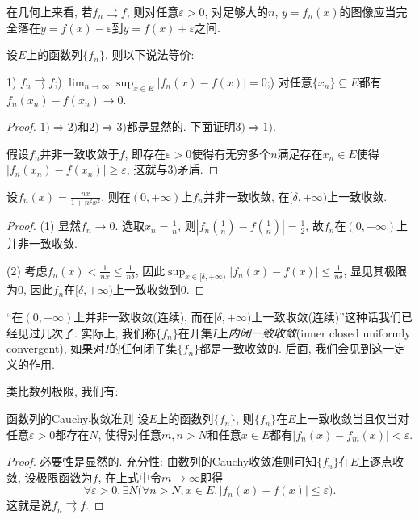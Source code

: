 在几何上来看, 若$f_n \rightrightarrows f$, 则对任意$\varepsilon >0$, 对足够大的$n$, $y=f_n(x)$的图像应当完全落在$y=f(x)-\varepsilon$到$y=f(x)+\varepsilon$之间. 

\begin{proposition}{}
	设$E$上的函数列$\{ f_n \}$, 则以下说法等价: 
	
	1) $f_n \rightrightarrows f$;) $\displaystyle \lim_{n\to \infty} \sup_{x \in E}|f_n(x) - f(x)|=0$;) 对任意$\{ x_n \}\subseteq E$都有$f_n(x_n)-f(x_n) \to 0$. 
\end{proposition}
\begin{proof}
	$1) \Rightarrow 2)$和$2) \Rightarrow 3)$都是显然的. 下面证明$3) \Rightarrow 1)$. 
	
	假设$f_n$并非一致收敛于$f$, 即存在$\varepsilon >0$使得有无穷多个$n$满足存在$x_n \in E$使得$|f_n(x_n)-f(x_n)| \geq \varepsilon$, 这就与$3)$矛盾. 
\end{proof}

\begin{example}
	设$f_n(x)=\frac{nx}{1+n^2x^2}$, 则在$(0,+\infty)$上$f_n$并非一致收敛, 在$[\delta ,+\infty )$上一致收敛. 
\end{example}
\begin{proof}
	(1) 显然$f_n \to 0$. 选取$x_n=\frac{1}{n}$, 则$|f_n(\frac{1}{n})-f(\frac{1}{n})| = \frac{1}{2}$, 故$f_n$在$(0,+\infty)$上并非一致收敛. 
	
	(2) 考虑$f_n(x) < \frac{1}{nx} \leq \frac{1}{n\delta}$, 因此$\sup _{x \in [\delta ,+\infty )} |f_n(x)-f(x)| \leq \frac{1}{n\delta}$, 显见其极限为$0$, 因此$f_n$在$[\delta ,+\infty )$上一致收敛到$0$. 
\end{proof}

“在$(0,+\infty)$上并非一致收敛(连续), 而在$[\delta ,+\infty )$上一致收敛(连续)”这种话我们已经见过几次了. 实际上, 我们称$\{ f_n \}$在开集$I$上\textit{内闭一致收敛}(inner closed uniformly convergent), 如果对$I$的任何闭子集$\{ f_n \}$都是一致收敛的. 后面, 我们会见到这一定义的作用. 

类比数列极限, 我们有: 

\begin{theorem}{函数列的Cauchy收敛准则} \label{thm:hjuulpcauchy}
	设$E$上的函数列$\{ f_n \}$, 则$\{ f_n \}$在$E$上一致收敛当且仅当对任意$\varepsilon >0$都存在$N$, 使得对任意$m,n > N$和任意$x \in E$都有$|f_n(x)-f_m(x)|<\varepsilon$. 
\end{theorem}
\begin{proof}
	必要性是显然的. 充分性: 由数列的Cauchy收敛准则可知$\{ f_n \}$在$E$上逐点收敛, 设极限函数为$f$, 在上式中令$m\to \infty$即得$$\forall \varepsilon >0, \exists N \big(\forall n>N,x \in E,  |f_n(x)-f(x)|\leq \varepsilon \big).$$
	这就是说$f_n \rightrightarrows f$. 
\end{proof}

